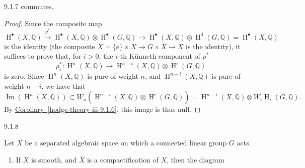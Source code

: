 \begin{theorem}{9.1.7}
    commutes.\begin{proof}\par{}Since the composite map
      \[         \operatorname {H}^\bullet (X,\mathbb {Q})         \xrightarrow {p^*} \operatorname {H}^\bullet (X,\mathbb {Q})\otimes \operatorname {H}^\bullet (G,\mathbb {Q})         \to  \operatorname {H}^\bullet (X,\mathbb {Q})\otimes \operatorname {H}^0(G,\mathbb {Q})         = \operatorname {H}^\bullet (X,\mathbb {Q})       \]
      is the identity (the composite \(X=\{e\}\times  X\to  G\times  X\to  X\) is the identity), it suffices to prove that, for \(i>0\), the \(i\)-th Künneth component of \(\rho ^*\)
      \[         \rho _i^*\colon  \operatorname {H}^n(X,\mathbb {Q})         \to  \operatorname {H}^{n-i}(X,\mathbb {Q})\otimes \operatorname {H}^i(G,\mathbb {Q})       \]
      is zero.
      Since \(\operatorname {H}^n(X,\mathbb {Q})\) is pure of weight \(n\), and \(\operatorname {H}^{n-i}(X,\mathbb {Q})\) is pure of weight \(n-i\), we have that
      \[         \operatorname {Im}(\operatorname {H}^n(X,\mathbb {Q}))         \subset  W_n(\operatorname {H}^{n-i}(X,\mathbb {Q})\otimes \operatorname {H}^i(G,\mathbb {Q}))         = \operatorname {H}^{n-i}(X,\mathbb {Q})\otimes  W_i\operatorname {H}_i(G,\mathbb {Q}).       \]
      By \hyperref[hodge-theory-iii-9.1.6]{Corollary~\ref*{hodge-theory-iii-9.1.6}}, this image is thus null.\end{proof}\end{theorem}\begin{variant}{9.1.8}\label{hodge-theory-iii-9.1.8}\skipsinglepar\par{}Let \(X\) be a separated algebraic space on which a connected linear group \(G\) acts.

    
 \begin{enumerate}
      
 \item[(i)]
        If \(X\) is smooth, and \(\overline {X}\) is a compactification of \(X\), then the diagram

        


\end{enumerate}
\end{variant}
